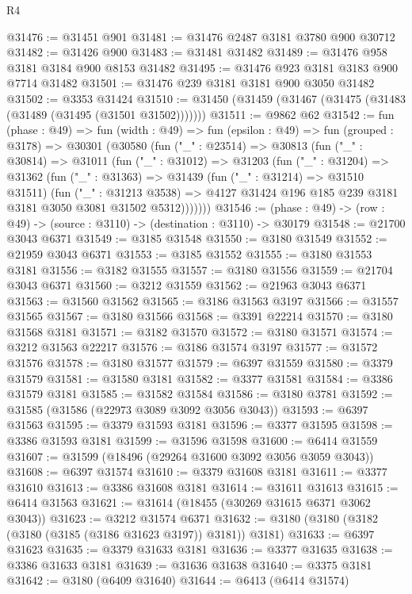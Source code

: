 \begin{lexlean}{R4}
\begin{coremodule}
@31476 := @31451 @901
@31481 := @31476 @2487 @3181 @3780 @900 @30712
@31482 := @31426 @900
@31483 := @31481 @31482
@31489 := @31476 @958 @3181 @3184 @900 @8153 @31482
@31495 := @31476 @923 @3181 @3183 @900 @7714 @31482
@31501 := @31476 @239 @3181 @3181 @900 @3050 @31482
@31502 := @3353 @31424
@31510 := @31450 (@31459 (@31467 (@31475 (@31483 (@31489 (@31495 (@31501 @31502)))))))
@31511 := @9862 @62
@31542 := fun (phase : @49) =>
  fun (width : @49) =>
  fun (epsilon : @49) =>
  fun (grouped : @3178) =>
  @30301
    (@30580
      (fun ("_" : @23514) =>
      @30813
        (fun ("_" : @30814) =>
        @31011
          (fun ("_" : @31012) =>
          @31203
            (fun ("_" : @31204) =>
            @31362
              (fun ("_" : @31363) =>
              @31439
                (fun ("_" : @31214) => @31510 @31511)
                (fun ("_" : @31213 @3538) =>
                @4127 @31424 @196 @185 @239 @3181 @3181 @3050 @3081 @31502 @5312)))))))
@31546 := (phase : @49) -> (row : @49) -> (source : @3110) -> (destination : @3110) -> @30179
@31548 := @21700 @3043 @6371
@31549 := @3185 @31548
@31550 := @3180 @31549
@31552 := @21959 @3043 @6371
@31553 := @3185 @31552
@31555 := @3180 @31553 @3181
@31556 := @3182 @31555
@31557 := @3180 @31556
@31559 := @21704 @3043 @6371
@31560 := @3212 @31559
@31562 := @21963 @3043 @6371
@31563 := @31560 @31562
@31565 := @3186 @31563 @3197
@31566 := @31557 @31565
@31567 := @3180 @31566
@31568 := @3391 @22214
@31570 := @3180 @31568 @3181
@31571 := @3182 @31570
@31572 := @3180 @31571
@31574 := @3212 @31563 @22217
@31576 := @3186 @31574 @3197
@31577 := @31572 @31576
@31578 := @3180 @31577
@31579 := @6397 @31559
@31580 := @3379 @31579
@31581 := @31580 @3181
@31582 := @3377 @31581
@31584 := @3386 @31579 @3181
@31585 := @31582 @31584
@31586 := @3180 @3781
@31592 := @31585 (@31586 (@22973 @3089 @3092 @3056 @3043))
@31593 := @6397 @31563
@31595 := @3379 @31593 @3181
@31596 := @3377 @31595
@31598 := @3386 @31593 @3181
@31599 := @31596 @31598
@31600 := @6414 @31559
@31607 := @31599 (@18496 (@29264 @31600 @3092 @3056 @3059 @3043))
@31608 := @6397 @31574
@31610 := @3379 @31608 @3181
@31611 := @3377 @31610
@31613 := @3386 @31608 @3181
@31614 := @31611 @31613
@31615 := @6414 @31563
@31621 := @31614 (@18455 (@30269 @31615 @6371 @3062 @3043))
@31623 := @3212 @31574 @6371
@31632 := @3180 (@3180 (@3182 (@3180 (@3185 (@3186 @31623 @3197)) @3181)) @3181)
@31633 := @6397 @31623
@31635 := @3379 @31633 @3181
@31636 := @3377 @31635
@31638 := @3386 @31633 @3181
@31639 := @31636 @31638
@31640 := @3375 @3181
@31642 := @3180 (@6409 @31640)
@31644 := @6413 (@6414 @31574)

\end{coremodule}
\end{lexlean}
